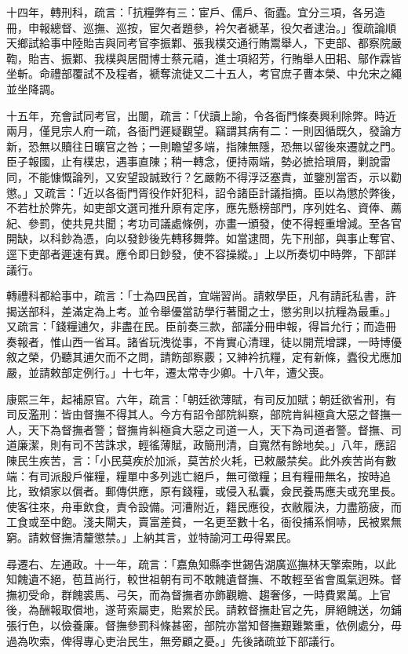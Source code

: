 \begin{pinyinscope}
十四年，轉刑科，疏言：「抗糧弊有三：宦戶、儒戶、衙蠹。宜分三項，各另造冊，申報總督、巡撫、巡按，宦欠者題參，衿欠者褫革，役欠者逮治。」復疏論順天鄉試給事中陸貽吉與同考官李振鄴、張我樸交通行賄鬻舉人，下吏部、都察院嚴鞫，貽吉、振鄴、我樸與居間博士蔡元禧，進士項紹芳，行賄舉人田耜、鄔作霖皆坐斬。命禮部覆試不及程者，褫奪流徙又二十五人，考官庶子曹本榮、中允宋之繩並坐降調。

十五年，充會試同考官，出闈，疏言：「伏讀上諭，令各衙門條奏興利除弊。時近兩月，僅見宗人府一疏，各衙門遲疑觀望。竊謂其病有二：一則因循既久，發論方新，恐無以贖往日曠官之咎；一則瞻望多端，指陳無隱，恐無以留後來遷就之門。臣子報國，止有樸忠，遇事直陳；稍一轉念，便持兩端，勢必摭拾瑣屑，剿說雷同，不能慷慨論列，又安望設誠致行？乞嚴飭不得浮泛塞責，並鑒別當否，示以勸懲。」又疏言：「近以各衙門胥役作奸犯科，詔令諸臣計議指摘。臣以為懲於弊後，不若杜於弊先，如吏部文選司推升原有定序，應先懸榜部門，序列姓名、資俸、薦紀、參罰，使共見共聞；考功司議處條例，亦畫一頒發，使不得輕重增減。至各官開缺，以科鈔為憑，向以發鈔後先轉移舞弊。如當逮問，先下刑部，與事止奪官、逕下吏部者遲速有異。應令即日鈔發，使不容操縱。」上以所奏切中時弊，下部詳議行。

轉禮科都給事中，疏言：「士為四民首，宜端習尚。請敕學臣，凡有請託私書，許揭送部科，差滿定為上考。並令舉優當訪學行著聞之士，懲劣則以抗糧為最重。」又疏言：「錢糧逋欠，非盡在民。臣前奏三款，部議分冊申報，得旨允行；而造冊奏報者，惟山西一省耳。諸省玩洩從事，不肯實心清理，徒以開荒增課，一時博優敘之榮，仍聽其逋欠而不之問，請飭部察覈；又紳衿抗糧，定有新條，蠹役尤應加嚴，並請敕部定例行。」十七年，遷太常寺少卿。十八年，遭父喪。

康熙三年，起補原官。六年，疏言：「朝廷欲薄賦，有司反加賦；朝廷欲省刑，有司反濫刑：皆由督撫不得其人。今方有詔令部院糾察，部院肯糾極貪大惡之督撫一人，天下為督撫者警；督撫肯糾極貪大惡之司道一人，天下為司道者警。督撫、司道廉潔，則有司不苦誅求，輕徭薄賦，政簡刑清，自寬然有餘地矣。」八年，應詔陳民生疾苦，言：「小民莫疾於加派，莫苦於火耗，已敕嚴禁矣。此外疾苦尚有數端：有司派殷戶催糧，糧單中多列逃亡絕戶，無可徵糧；且有糧冊無名，按時追比，致傾家以償者。郵傳供應，原有錢糧，或侵入私囊，僉民養馬應夫或充里長。使客往來，舟車飲食，責令設備。河漕附近，籍民應役，衣敝履決，力盡筋疲，而工食或至中飽。淺夫閘夫，賣富差貧，一名更至數十名，衙役捕系恫哧，民被累無窮。請敕督撫清釐懲禁。」上納其言，並特諭河工毋得累民。

尋遷右、左通政。十一年，疏言：「嘉魚知縣李世錫告湖廣巡撫林天擎索賄，以此知餽遺不絕，苞苴尚行，較世祖朝有司不敢餽遺督撫、不敢輕至省會風氣迥殊。督撫初受命，群餽裘馬、弓矢，而為督撫者亦飾觀瞻、趨奢侈，一時費累萬。上官後，為酬報取償地，遂苛索屬吏，貽累於民。請敕督撫赴官之先，屏絕餽送，勿鋪張行色，以儉養廉。督撫參罰科條甚密，部院亦當知督撫艱難繁重，依例處分，毋過為吹索，俾得專心吏治民生，無旁顧之憂。」先後諸疏並下部議行。


\end{pinyinscope}
